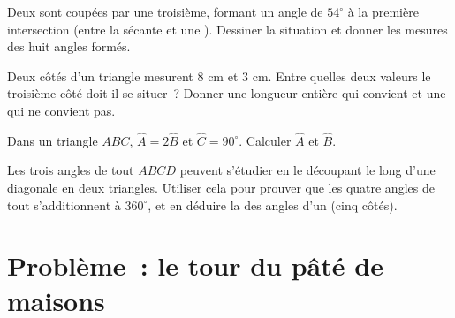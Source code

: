 \begin{exercise}[$\star\star$]\label{exo:g7:triangles:8}
Deux  sont coupées par une troisième, formant un
angle de $54^\circ$ à la première intersection (entre la sécante et
une ). Dessiner la situation et donner les mesures des huit
angles formés.
\end{exercise}

\begin{exercise}[$\star\star$]\label{exo:g7:triangles:9}
Deux côtés d'un triangle mesurent $8$ cm et $3$ cm. Entre quelles
deux valeurs le troisième côté doit-il se situer~? Donner une
longueur entière qui convient et une qui ne convient pas.
\end{exercise}

\begin{exercise}[$\star\star$]\label{exo:g7:triangles:10}
Dans un triangle $ABC$, $\widehat A = 2\widehat B$ et
$\widehat C = 90^\circ$. Calculer $\widehat A$ et $\widehat B$.
\end{exercise}

\begin{exercise}[$\star\star\star$]\label{exo:g7:triangles:11}
Les trois angles de tout  $ABCD$ peuvent s'étudier en le
découpant le long d'une diagonale en deux triangles. Utiliser cela
pour prouver que les quatre angles de tout 
s'additionnent à $360^\circ$, et en déduire la  des angles d'un
 (cinq côtés).
\end{exercise}

\section{Problème~: le tour du pâté de maisons}

